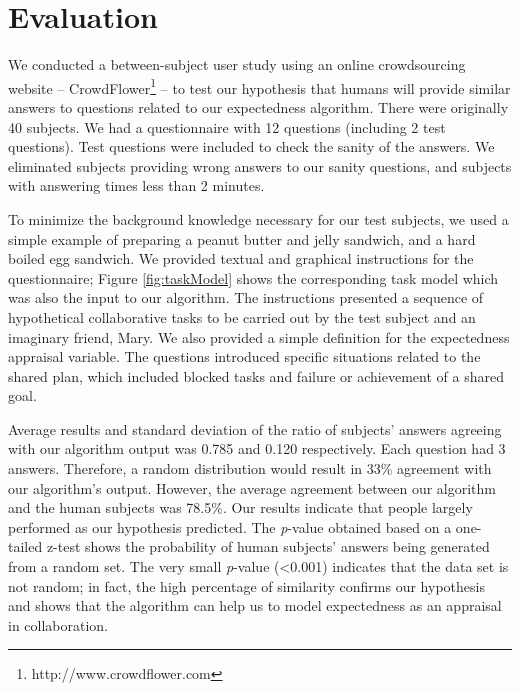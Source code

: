 \documentclass{aamas2016_extendedabstract}
\begin{document}
\vspace*{-6mm}
\section{Evaluation}

We conducted a between-subject user study using an online crowdsourcing website
-- CrowdFlower\footnote{http://www.crowdflower.com} -- to test our hypothesis
that humans will provide similar answers to questions related to our expectedness
algorithm. There were originally 40 subjects. We had a questionnaire with 12
questions (including 2 test questions). Test questions were included to check
the sanity of the answers. We eliminated subjects providing wrong answers to our
sanity questions, and subjects with answering times less than 2 minutes.

To minimize the background knowledge necessary for our test subjects, we used a
simple example of preparing a peanut butter and jelly sandwich, and a hard
boiled egg sandwich. We provided textual and graphical instructions for the
questionnaire; Figure \ref{fig:taskModel} shows the corresponding task
model which was also the input to our algorithm. The instructions presented a
sequence of hypothetical collaborative tasks to be carried out by the test
subject and an imaginary friend, Mary. We also provided a simple definition for
the expectedness appraisal variable. The questions introduced specific
situations related to the shared plan, which included blocked tasks and failure
or achievement of a shared goal. 

% 

Average results and standard deviation of the ratio of subjects' answers
agreeing with our algorithm output was 0.785 and 0.120 respectively. Each
question had 3 answers. Therefore, a random distribution would result in 33\%
agreement with our algorithm's output. However, the average agreement between
our algorithm and the human subjects was 78.5\%. Our results indicate that
people largely performed as our hypothesis predicted. The \textit{p}-value
obtained based on a one-tailed z-test shows the probability of human subjects'
answers being generated from a random set. The very small \textit{p}-value
(<0.001) indicates that the data set is not random; in fact, the high percentage
of similarity confirms our hypothesis and shows that the algorithm can help us
to model expectedness as an appraisal in collaboration.
\end{document}
